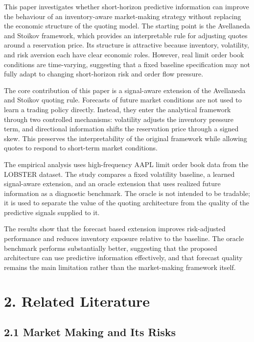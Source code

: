 \documentclass[12pt,a4paper]{article}
\let\originalsection\section
\renewcommand{\section}{\clearpage\originalsection}
\begin{document}
This paper investigates whether short-horizon predictive information can
improve the behaviour of an inventory-aware market-making strategy
without replacing the economic structure of the quoting model. The
starting point is the Avellaneda and Stoikov framework, which provides
an interpretable rule for adjusting quotes around a reservation price.
Its structure is attractive because inventory, volatility, and risk
aversion each have clear economic roles. However, real limit order book
conditions are time-varying, suggesting that a fixed baseline
specification may not fully adapt to changing short-horizon risk and
order flow pressure.

The core contribution of this paper is a signal-aware extension of the
Avellaneda and Stoikov quoting rule. Forecasts of future market
conditions are not used to learn a trading policy directly. Instead,
they enter the analytical framework through two controlled mechanisms:
volatility adjusts the inventory pressure term, and directional
information shifts the reservation price through a signed skew. This
preserves the interpretability of the original framework while allowing
quotes to respond to short-term market conditions.

The empirical analysis uses high-frequency AAPL limit order book data
from the LOBSTER dataset. The study compares a fixed volatility
baseline, a learned signal-aware extension, and an oracle extension that
uses realized future information as a diagnostic benchmark. The oracle
is not intended to be tradable; it is used to separate the value of the
quoting architecture from the quality of the predictive signals supplied
to it.

The results show that the forecast based extension improves
risk-adjusted performance and reduces inventory exposure relative to the
baseline. The oracle benchmark performs substantially better, suggesting
that the proposed architecture can use predictive information
effectively, and that forecast quality remains the main limitation
rather than the market-making framework itself.

\section{2. Related Literature}\label{related-literature}

\subsection{2.1 Market Making and Its
Risks}\label{market-making-and-its-risks}
\end{document}
